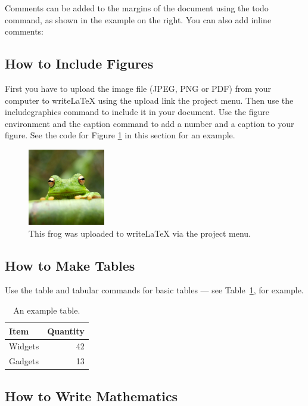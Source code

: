 \documentclass[a4paper]{article}
\begin{document}
Comments can be added to the margins of the document using the  todo command, as shown in the example on the right. You can also add inline comments:


\subsection{How to Include Figures}

First you have to upload the image file (JPEG, PNG or PDF) from your computer to writeLaTeX using the upload link the project menu. Then use the includegraphics command to include it in your document. Use the figure environment and the caption command to add a number and a caption to your figure. See the code for Figure \ref{fig:frog} in this section for an example.

\begin{figure}
\centering
\includegraphics[width=0.3\textwidth]{frog.jpg}
\caption{\label{fig:frog}This frog was uploaded to writeLaTeX via the project menu.}
\end{figure}

\subsection{How to Make Tables}

Use the table and tabular commands for basic tables --- see Table~\ref{tab:widgets}, for example.

\begin{table}
\centering
\begin{tabular}{l|r}
Item & Quantity \\\hline
Widgets & 42 \\
Gadgets & 13
\end{tabular}
\caption{\label{tab:widgets}An example table.}
\end{table}

\subsection{How to Write Mathematics}
\end{document}
